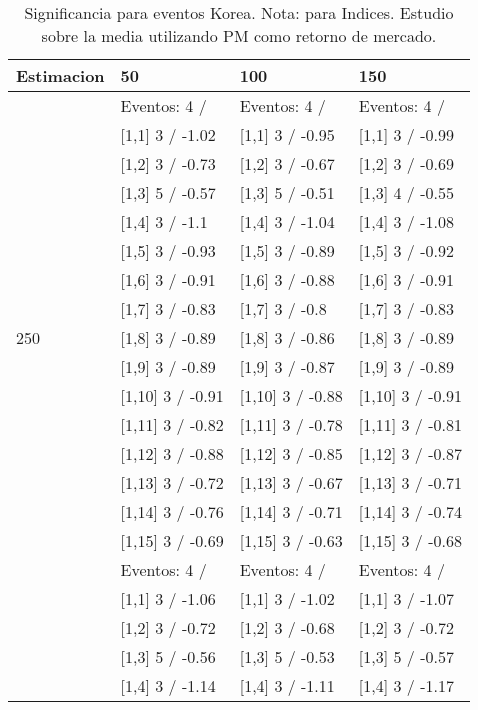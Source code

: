 \begin{table}

\caption{Significancia para eventos Korea. Nota: para Indices. Estudio sobre la media utilizando PM como retorno de mercado.}
\centering
\begin{tabular}[t]{llll}
\toprule
Estimacion & 50 & 100 & 150\\
\midrule
 & Eventos:  4 / & Eventos:  4 / & Eventos:  4 /\\
 & {}[1,1] 3  / -1.02 & {}[1,1] 3  / -0.95 & {}[1,1] 3  / -0.99\\
 & {}[1,2] 3  / -0.73 & {}[1,2] 3  / -0.67 & {}[1,2] 3  / -0.69\\
 & {}[1,3] 5  / -0.57 & {}[1,3] 5  / -0.51 & {}[1,3] 4  / -0.55\\
 & {}[1,4] 3  / -1.1 & {}[1,4] 3  / -1.04 & {}[1,4] 3  / -1.08\\
\addlinespace
 & {}[1,5] 3  / -0.93 & {}[1,5] 3  / -0.89 & {}[1,5] 3  / -0.92\\
 & {}[1,6] 3  / -0.91 & {}[1,6] 3  / -0.88 & {}[1,6] 3  / -0.91\\
 & {}[1,7] 3  / -0.83 & {}[1,7] 3  / -0.8 & {}[1,7] 3  / -0.83\\
250 & {}[1,8] 3  / -0.89 & {}[1,8] 3  / -0.86 & {}[1,8] 3  / -0.89\\
 & {}[1,9] 3  / -0.89 & {}[1,9] 3  / -0.87 & {}[1,9] 3  / -0.89\\
\addlinespace
 & {}[1,10] 3  / -0.91 & {}[1,10] 3  / -0.88 & {}[1,10] 3  / -0.91\\
 & {}[1,11] 3  / -0.82 & {}[1,11] 3  / -0.78 & {}[1,11] 3  / -0.81\\
 & {}[1,12] 3  / -0.88 & {}[1,12] 3  / -0.85 & {}[1,12] 3  / -0.87\\
 & {}[1,13] 3  / -0.72 & {}[1,13] 3  / -0.67 & {}[1,13] 3  / -0.71\\
 & {}[1,14] 3  / -0.76 & {}[1,14] 3  / -0.71 & {}[1,14] 3  / -0.74\\
\addlinespace
 & {}[1,15] 3  / -0.69 & {}[1,15] 3  / -0.63 & {}[1,15] 3  / -0.68\\
 & Eventos:  4 / & Eventos:  4 / & Eventos:  4 /\\
 & {}[1,1] 3  / -1.06 & {}[1,1] 3  / -1.02 & {}[1,1] 3  / -1.07\\
 & {}[1,2] 3  / -0.72 & {}[1,2] 3  / -0.68 & {}[1,2] 3  / -0.72\\
 & {}[1,3] 5  / -0.56 & {}[1,3] 5  / -0.53 & {}[1,3] 5  / -0.57\\
\addlinespace
 & {}[1,4] 3  / -1.14 & {}[1,4] 3  / -1.11 & {}[1,4] 3  / -1.17\\

\end{tabular}
\end{table}

